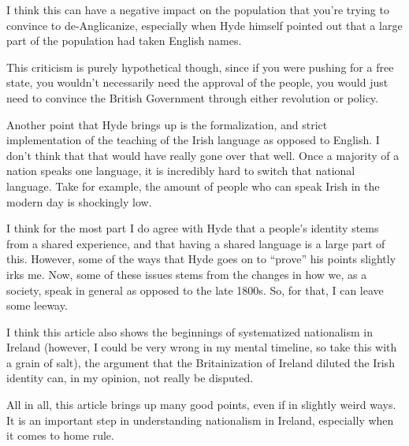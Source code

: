 \documentclass[12pt]{article}
\begin{document}
    I think this can have a negative impact on the population that you're trying to convince to de-Anglicanize, especially when Hyde himself pointed out that a large part of the population had taken English names.
    \par This criticism is purely hypothetical though, since if you were pushing for a free state, you wouldn't necessarily need the approval of the people, you would just need to convince the British Government through either revolution or policy.
    \par Another point that Hyde brings up is the formalization, and strict implementation of the teaching of the Irish language as opposed to English. I don't think that that would have really gone over that well. Once a majority of a nation speaks one language, it is incredibly hard to switch that national language. Take for example, the amount of people who can speak Irish in the modern day is shockingly low.
    \par I think for the most part I do agree with Hyde that a people's identity stems from a shared experience, and that having a shared language is a large part of this. However, some of the ways that Hyde goes on to ``prove'' his points slightly irks me.
    Now, some of these issues stems from the changes in how we, as a society, speak in general as opposed to the late 1800s. So, for that, I can leave some leeway.
    \par I think this article also shows the beginnings of systematized nationalism in Ireland (however, I could be very wrong in my mental timeline, so take this with a grain of salt), the argument that the Britainization of Ireland diluted the Irish identity can, in my opinion, not really be disputed.
    \par All in all, this article brings up many good points, even if in slightly weird ways. It is an important step in understanding nationalism in Ireland, especially when it comes to home rule.
\end{document}
